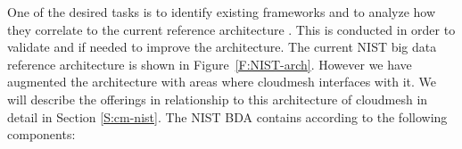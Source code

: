 
One of the desired tasks is to identify existing frameworks and to
analyze how they correlate to the current reference architecture
\cite{nist-bd}. This is conducted in order to validate and if needed
to improve the architecture.  The current NIST big data reference
architecture is shown in Figure~\ref{F:NIST-arch}. However we have
augmented the architecture with areas where cloudmesh interfaces with
it. We will describe the offerings in relationship to this
architecture of cloudmesh in detail in Section \ref{S:cm-nist}.  The
NIST BDA contains according to \cite{nist-bd} the following
components:



